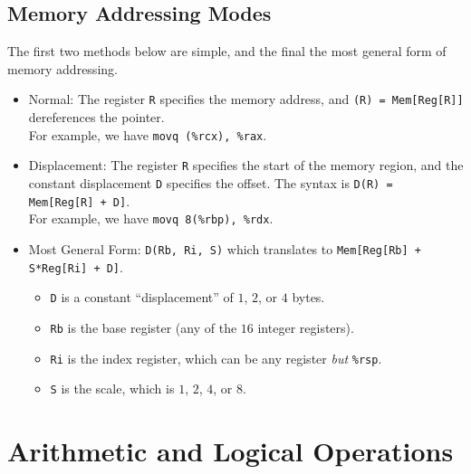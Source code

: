 \documentclass[class=article, crop=false]{standalone}
\begin{document}
  \subsection{Memory Addressing Modes}
  The first two methods below are simple, and the final the most general form of memory addressing.
  \begin{itemize}
    \item Normal: The register \texttt{R} specifies the memory address, and \texttt{(R) = Mem[Reg[R]]} dereferences the pointer. \\
    For example, we have \texttt{movq (\%rcx), \%rax}.
    \item Displacement: The register \texttt{R} specifies the start of the memory region, and the constant displacement \texttt{D} specifies the offset. The syntax is \texttt{D(R) = Mem[Reg[R] + D]}. \\
    For example, we have \texttt{movq 8(\%rbp), \%rdx}.
    \item Most General Form: \texttt{D(Rb, Ri, S)} which translates to \texttt{Mem[Reg[Rb] + S*Reg[Ri] + D]}.
    \begin{itemize}
      \item \texttt{D} is a constant ``displacement'' of $1$, $2$, or $4$ bytes.
      \item \texttt{Rb} is the base register (any of the $16$ integer registers).
      \item \texttt{Ri} is the index register, which can be any register \emph{but} \texttt{\%rsp}.
      \item \texttt{S} is the scale, which is $1$, $2$, $4$, or $8$.
    \end{itemize}
  \end{itemize}
  \section{Arithmetic and Logical Operations}
\end{document}
